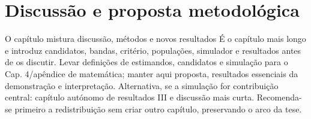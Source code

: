 
\chapter{Discussão e proposta metodológica}
\label{cha:discussao}
{O capítulo mistura discussão, métodos e novos resultados}
{É o capítulo mais longo e introduz candidatos, bandas, critério,
populações, simulador e resultados antes de os discutir. Levar definições
de estimandos, candidatos e simulação para o Cap. 4/apêndice de matemática; manter
aqui proposta, resultados essenciais da demonstração e interpretação.
Alternativa, se a simulação for contribuição central: capítulo autónomo
de resultados III e discussão mais curta. Recomenda-se primeiro a
redistribuição sem criar outro capítulo, preservando o arco da tese.}%

